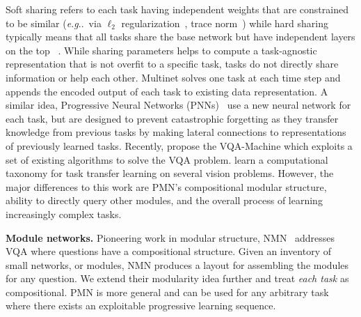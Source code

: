 \documentclass{article}
\makeatletter
\DeclareRobustCommand\onedot{\futurelet\@let@token\@onedot}
\def\@onedot{\ifx\@let@token.\else.\null\fi\xspace}
\def\eg{\emph{e.g}\onedot} \def\Eg{\emph{E.g}\onedot}
\makeatother
\begin{document}
Soft sharing refers to each task having independent weights that are constrained to be similar (\eg~via $\ell_2$ regularization~\citep{duong15softmtl}, trace norm~\citep{yang17softmtl}) while hard sharing typically means that all tasks share the base network but have independent layers on the top ~\citep{kokkinos17ubernet,misra16cross_stitch}.
While sharing parameters helps to compute a task-agnostic representation that is not overfit to a specific task, tasks do not directly share information or help each other.
Multinet solves one task at each time step and appends the encoded output of each task to existing data representation. %
A similar idea, Progressive Neural Networks (PNNs)~\citep{rusu16} use a new neural network for each task, but are designed to prevent catastrophic forgetting as they transfer knowledge from previous tasks by making lateral connections to representations of previously learned tasks. %
Recently, \citet{wang2017vqa} propose the VQA-Machine which exploits a set of existing algorithms to solve the VQA problem.
\citet{zamir2018taskonomy} learn a computational taxonomy for task transfer learning on several vision problems.
However, the major differences to this work are PMN's compositional modular structure, ability to directly query other modules, and the overall process of learning increasingly complex tasks.

\iffalse
Parent modules in PMN choose and call lower modules, and use the outputs of queried modules directly to solve their task.
This interaction lets PMN be more data efficient as modules can be trained on different datasets and the knowledge utilized by other tasks. %
PMNs are also a stepping stone to train a universal and intelligent machine that progressively improves itself by learning new tasks, while relating them to the ones it already knows.
\fi\textbf{Module networks.}%
Pioneering work in modular structure, NMN~\citep{andreas16,hu17} addresses VQA where questions have a compositional structure.
Given an inventory of small networks, or modules, NMN produces a layout for assembling the modules for any question.
We extend their modularity idea further and treat \emph{each task} as compositional.
PMN is more general and can be used for any arbitrary task where there exists an exploitable progressive learning sequence.
\end{document}
